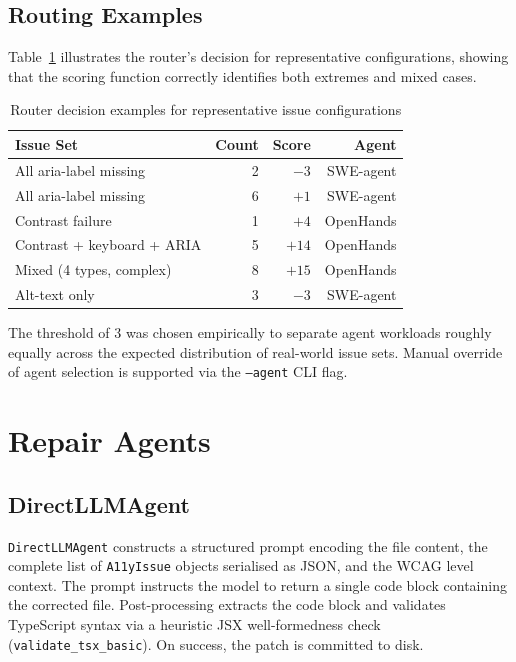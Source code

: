 \documentclass[10pt,conference]{IEEEtran}
\begin{document}
\subsection{Routing Examples}

Table~\ref{tab:routing} illustrates the router's decision for representative
configurations, showing that the scoring function correctly identifies both
extremes and mixed cases.

\begin{table}[htbp]
\caption{Router decision examples for representative issue configurations}
\label{tab:routing}
\centering\small
\begin{tabularx}{\columnwidth}{Xrrr}
\toprule
\textbf{Issue Set} & \textbf{Count} & \textbf{Score} & \textbf{Agent} \\
\midrule
All aria-label missing      & 2  & $-3$ & SWE-agent \\
All aria-label missing      & 6  & $+1$ & SWE-agent \\
Contrast failure            & 1  & $+4$ & OpenHands \\
Contrast + keyboard + ARIA  & 5  & $+14$ & OpenHands \\
Mixed (4 types, complex)    & 8  & $+15$ & OpenHands \\
Alt-text only               & 3  & $-3$ & SWE-agent \\
\bottomrule
\end{tabularx}
\end{table}

The threshold of 3 was chosen empirically to separate agent workloads roughly
equally across the expected distribution of real-world issue sets.  Manual
override of agent selection is supported via the \texttt{--agent} CLI flag.

\section{Repair Agents}
\label{sec:agents}

\subsection{DirectLLMAgent}

\texttt{DirectLLMAgent} constructs a structured prompt encoding the file
content, the complete list of \texttt{A11yIssue} objects serialised as JSON,
and the WCAG level context.  The prompt instructs the model to return a
single code block containing the corrected file.  Post-processing extracts
the code block and validates TypeScript syntax via a heuristic JSX
well-formedness check (\texttt{validate\_tsx\_basic}).  On success, the
patch is committed to disk.
\end{document}
